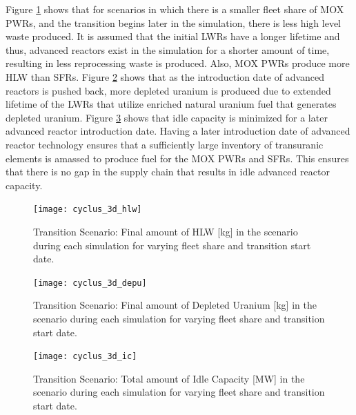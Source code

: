 Figure \ref{fig:cyclus_3d_hlw} shows that for scenarios in which 
there is a smaller fleet share of \gls{MOX} \glspl{PWR}, and the 
transition begins later in the simulation, there is less high 
level waste produced. 
It is assumed that the initial \glspl{LWR} have a longer lifetime
and thus, advanced reactors exist in the simulation for a shorter 
amount of time, resulting in less reprocessing waste is produced. 
Also, \gls{MOX} \glspl{PWR} produce more \gls{HLW} than \glspl{SFR}. 
Figure \ref{fig:cyclus_3d_depu} shows that as the introduction date 
of advanced reactors is pushed back, more depleted uranium is produced 
due to extended lifetime of the \glspl{LWR} that utilize enriched 
natural uranium fuel that generates depleted uranium. 
Figure \ref{fig:cyclus_3d_ic} shows that idle capacity is minimized 
for a later advanced reactor introduction date. 
Having a later introduction date of advanced reactor technology ensures 
that a sufficiently large inventory of transuranic elements is amassed
to produce fuel for the \gls{MOX} \glspl{PWR} and \glspl{SFR}.  
This ensures that there is no gap in the supply chain that results 
in idle advanced reactor capacity.

\begin{figure}[]
    \centering
    \texttt{[image: cyclus\_3d\_hlw]} 
    \caption{\Cyclus Transition Scenario: Final amount of HLW [kg] in the scenario during each simulation for varying fleet share and transition start date.}
    \label{fig:cyclus_3d_hlw}
\end{figure}

\begin{figure}[]
    \centering
    \texttt{[image: cyclus\_3d\_depu]} 
    \caption{\Cyclus Transition Scenario: Final amount of Depleted Uranium [kg] in the scenario during each simulation for varying fleet share and transition start date.}
    \label{fig:cyclus_3d_depu}
\end{figure}

\begin{figure}[]
    \centering
    \texttt{[image: cyclus\_3d\_ic]} 
    \caption{\Cyclus Transition Scenario: Total amount of Idle Capacity [MW] in the scenario during each simulation for varying fleet share and transition start date.}
    \label{fig:cyclus_3d_ic}
\end{figure}

